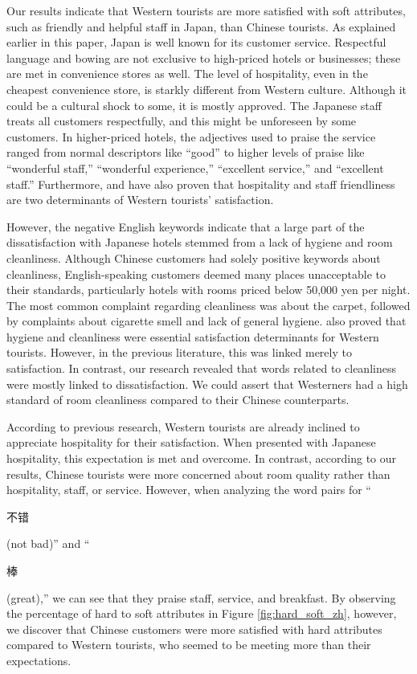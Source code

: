 \documentclass[smallextended,natbib]{svjour3}       %
\begin{document}
    Our results indicate that Western tourists are more satisfied with soft attributes, such as friendly and helpful staff in Japan, than Chinese tourists. As explained earlier in this paper, Japan is well known for its customer service. Respectful language and bowing are not exclusive to high-priced hotels or businesses; these are met in convenience stores as well. The level of hospitality, even in the cheapest convenience store, is starkly different from Western culture. Although it could be a cultural shock to some, it is mostly approved. The Japanese staff treats all customers respectfully, and this might be unforeseen by some customers. In higher-priced hotels, the adjectives used to praise the service ranged from normal descriptors like ``good'' to higher levels of praise like ``wonderful staff,'' ``wonderful experience,'' ``excellent service,'' and ``excellent staff.'' Furthermore, \cite{kozak2002} and \cite{shanka2004} have also proven that hospitality and staff friendliness are two determinants of Western tourists' satisfaction.

    However, the negative English keywords indicate that a large part of the dissatisfaction with Japanese hotels stemmed from a lack of hygiene and room cleanliness. Although Chinese customers had solely positive keywords about cleanliness, English-speaking customers deemed many places unacceptable to their standards, particularly hotels with rooms priced below 50,000 yen per night. The most common complaint regarding cleanliness was about the carpet, followed by complaints about cigarette smell and lack of general hygiene. \cite{kozak2002} also proved that hygiene and cleanliness were essential satisfaction determinants for Western tourists. However, in the previous literature, this was linked merely to satisfaction. In contrast, our research revealed that words related to cleanliness were mostly linked to dissatisfaction. We could assert that Westerners had a high standard of room cleanliness compared to their Chinese counterparts.

    According to previous research, Western tourists are already inclined to appreciate hospitality for their satisfaction. When presented with Japanese hospitality, this expectation is met and overcome. In contrast, according to our results, Chinese tourists were more concerned about room quality rather than hospitality, staff, or service. However, when analyzing the word pairs for ``\begin{CJK}{UTF8}{gbsn}不错\end{CJK} (not bad)'' and ``\begin{CJK}{UTF8}{gbsn}棒\end{CJK} (great),'' we can see that they praise staff, service, and breakfast. By observing the percentage of hard to soft attributes in Figure \ref{fig:hard_soft_zh}, however, we discover that Chinese customers were more satisfied with hard attributes compared to Western tourists, who seemed to be meeting more than their expectations.
\end{document}
